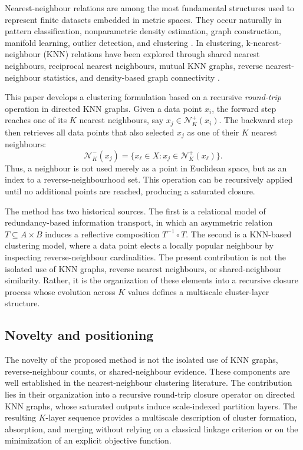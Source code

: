 \documentclass[pdflatex,sn-mathphys-num]{sn-jnl}
\newcommand{\calN}{\mathcal{N}}
\begin{document}
Nearest-neighbour relations are among the most fundamental structures used to represent finite datasets embedded in metric spaces. They occur naturally in pattern classification, nonparametric density estimation, graph construction, manifold learning, outlier detection, and clustering \citep{CoverHart1967,LoftsgaardenQuesenberry1965,Bentley1975,FriedmanBentleyFinkel1977,VonLuxburg2007}. In clustering, k-nearest-neighbour (KNN) relations have been explored through shared nearest neighbours, reciprocal nearest neighbours, mutual KNN graphs, reverse nearest-neighbour statistics, and density-based graph connectivity \citep{JarvisPatrick1973,ErtozSteinbachKumar2003,BritoChavezQuirozYukich1997,GowdaKrishna1978,ChowdhuryAmorim2018,XieLeeWangChenZhou2019}.

This paper develops a clustering formulation based on a recursive \emph{round-trip} operation in directed KNN graphs. Given a data point $x_i$, the forward step reaches one of its $K$ nearest neighbours, say $x_j\in\calN_K^+(x_i)$. The backward step then retrieves all data points that also selected $x_j$ as one of their $K$ nearest neighbours:
\begin{equation}
\calN_K^-(x_j)=\{x_\ell\in X: x_j\in\calN_K^+(x_\ell)\}.
\end{equation}
Thus, a neighbour is not used merely as a point in Euclidean space, but as an index to a reverse-neighbourhood set. This operation can be recursively applied until no additional points are reached, producing a saturated closure.

The method has two historical sources. The first is a relational model of redundancy-based information transport, in which an asymmetric relation $T\subseteq A\times B$ induces a reflective composition $T^{-1}\circ T$. The second is a KNN-based clustering model, where a data point elects a locally popular neighbour by inspecting reverse-neighbour cardinalities. The present contribution is not the isolated use of KNN graphs, reverse nearest neighbours, or shared-neighbour similarity. Rather, it is the organization of these elements into a recursive closure process whose evolution across $K$ values defines a multiscale cluster-layer structure.

\subsection{Novelty and positioning}

The novelty of the proposed method is not the isolated use of KNN graphs, reverse-neighbour counts, or shared-neighbour evidence. These components are well established in the nearest-neighbour clustering literature. The contribution lies in their organization into a recursive round-trip closure operator on directed KNN graphs, whose saturated outputs induce scale-indexed partition layers. The resulting $K$-layer sequence provides a multiscale description of cluster formation, absorption, and merging without relying on a classical linkage criterion or on the minimization of an explicit objective function.
\end{document}
